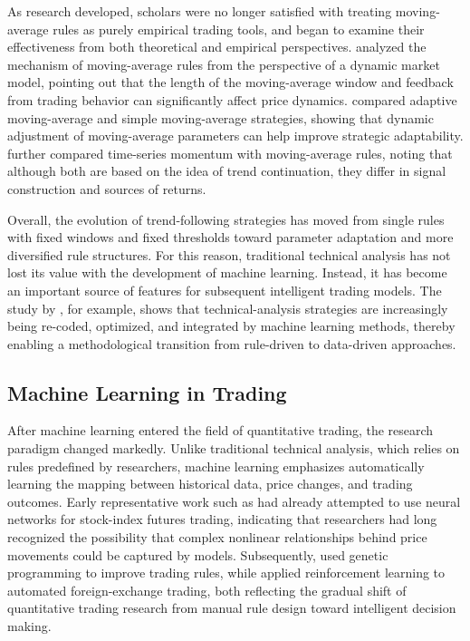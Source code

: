 \documentclass[12pt]{article}
\begin{document}
As research developed, scholars were no longer satisfied with treating moving-average rules as 
purely empirical trading tools, and began to examine their effectiveness from both theoretical 
and empirical perspectives. \citet{ChiarellaHeHommes2006} analyzed the mechanism of 
moving-average rules from the perspective of a dynamic market model, pointing out that the 
length of the moving-average window and feedback from trading behavior can significantly 
affect price dynamics. \citet{EllisParbery2005} compared adaptive moving-average and simple 
moving-average strategies, showing that dynamic adjustment of moving-average parameters can 
help improve strategic adaptability. \citet{MarshallNguyenVisaltanachoti2017} further compared 
time-series momentum with moving-average rules, noting that although both are based on the 
idea of trend continuation, they differ in signal construction and sources of returns.

Overall, the evolution of trend-following strategies has moved from single rules with fixed 
windows and fixed thresholds toward parameter adaptation and more diversified rule structures. 
For this reason, traditional technical analysis has not lost its value with the development of 
machine learning. Instead, it has become an important source of features for subsequent 
intelligent trading models. The study by \citet{AyalaEtAl2021}, for example, shows that 
technical-analysis strategies are increasingly being re-coded, optimized, and integrated 
by machine learning methods, thereby enabling a methodological transition from rule-driven to 
data-driven approaches.

\subsection{Machine Learning in Trading}

After machine learning entered the field of quantitative trading, the research paradigm changed 
markedly. Unlike traditional technical analysis, which relies on rules predefined by researchers, 
machine learning emphasizes automatically learning the mapping between historical data, price 
changes, and trading outcomes. Early representative work such as \citet{TrippiDeSieno1992} had 
already attempted to use neural networks for stock-index futures trading, indicating that 
researchers had long recognized the possibility that complex nonlinear relationships behind 
price movements could be captured by models. Subsequently, \citet{DempsterJones2001} used 
genetic programming to improve trading rules, while \citet{DempsterLeemans2006} applied 
reinforcement learning to automated foreign-exchange trading, both reflecting the gradual 
shift of quantitative trading research from manual rule design toward intelligent decision
making.
\end{document}
